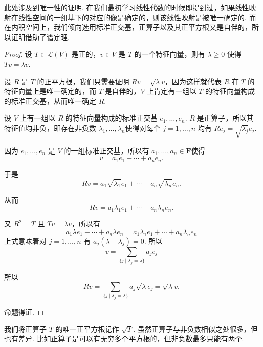 此处涉及到唯一性的证明. 在我们最初学习线性代数的时候即提到过，如果线性映射在线性空间的一组基下的对应的像是确定的，则该线性映射是被唯一确定的. 而在内积空间上，我们倾向选用标准正交基，正算子以及其正平方根又是自伴的，所以证明借助了谱定理.

\begin{proof}
    设 $ T \in \mathcal{L}(V) $ 是正的，$ v \in V $ 是 $ T $ 的一个特征向量，则有 $ \lambda \geqslant 0 $ 使得 $ Tv = \lambda v $.

    设 $ R $ 是 $ T $ 的正平方根，我们只需要证明 $ Rv = \sqrt{\lambda} v $，因为这样就代表 $ R $ 在 $ T $ 的特征向量上是唯一确定的，而 $ T $ 是自伴的，$ V $ 上肯定有一组以 $ T $ 的特征向量构成的标准正交基，从而唯一确定 $ R $.

    设 $ V $ 上有一组以 $ R $ 的特征向量构成的标准正交基 $ e_1, \ldots , e_n $. $ R $ 是正算子，所以其特征值均非负，即存在非负数 $\lambda_1, \ldots , \lambda_n $使得对每个 $ j = 1, \ldots , n $ 均有 $ Re_j = \sqrt{\lambda_j}e_j $.

    因为 $ e_1, \ldots , e_n $ 是 $ V $ 的一组标准正交基，所以有 $ a_1, \ldots , a_n \in \mathbf{F} $使得
    \[ v = a_1e_1 + \cdots + a_ne_n. \]

    于是
    \[ Rv = a_1\sqrt{\lambda_1}e_1 + \cdots + a_n\sqrt{\lambda_n}e_n. \]

    从而
    \[ Rv = a_1\lambda_1e_1 + \cdots + a_n\lambda_ne_n. \]

    又 $ R^{2} = T $ 且 $ Tv = \lambda v $，所以有
    \[ a_1\lambda e_1 + \cdots + a_n\lambda e_n = a_1\lambda_1e_1 + \cdots + a_n\lambda_ne_n \]
    上式意味着对 $ j = 1, \ldots, n $ 有 $ a_j(\lambda - \lambda_j) = 0 $. 所以
    \[ v = \sum_{\{j \mid \lambda_j = \lambda \}} a_je_j \]

    所以
    \[ Rv = \sum_{\{j \mid \lambda_j = \lambda \}} a_j\sqrt{\lambda}e_j = \sqrt{\lambda}v. \]

    命题得证.
\end{proof}

我们将正算子 $ T $ 的唯一正平方根记作 $ \sqrt{T} $. 虽然正算子与非负数相似之处很多，但也有差异. 比如正算子是可以有无穷多个平方根的，但非负数最多只能有两个.



